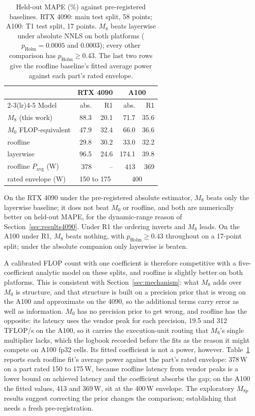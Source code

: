 \documentclass[conference]{IEEEtran}
\begin{document}
\begin{table}[t]
\caption{Held-out MAPE (\%) against pre-registered baselines. RTX 4090:
main test split, 58 points; A100: T1 test split, 17 points. $M_8$ beats
layerwise under absolute NNLS on both platforms ($p_{\mathrm{Holm}} =
0.0005$ and $0.0003$); every other comparison has $p_{\mathrm{Holm}} \geq
0.43$. The last two rows give the roofline baseline's fitted average power
against each part's rated envelope.}
\label{tab:baselines}
\centering
\small
\begin{tabular}{lrrrr}
\toprule
 & \multicolumn{2}{c}{RTX 4090} & \multicolumn{2}{c}{A100} \\
\cmidrule(lr){2-3}\cmidrule(lr){4-5}
Model & abs. & R1 & abs. & R1 \\
\midrule
$M_8$ (this work) & 88.3 & 20.1 & 71.7 & 35.6 \\
$M_0$ FLOP-equivalent & 47.9 & 32.4 & 66.0 & 36.6 \\
roofline & 29.8 & 30.2 & 33.0 & 32.2 \\
layerwise & 96.5 & 24.6 & 174.1 & 39.8 \\
\midrule
roofline $P_{\mathrm{avg}}$ (W) & 378 & -- & 413 & 369 \\
rated envelope (W) & \multicolumn{2}{c}{150 to 175} & \multicolumn{2}{c}{400} \\
\bottomrule
\end{tabular}
\end{table}

On the RTX 4090 under the pre-registered absolute estimator, $M_8$ beats
only the layerwise baseline; it does not beat $M_0$ or roofline, and both
are numerically better on held-out MAPE, for the dynamic-range reason of
Section~\ref{sec:results4090}. Under R1 the ordering inverts and $M_8$
leads. On the A100 under R1, $M_8$ beats nothing, with
$p_{\mathrm{Holm}} \geq 0.43$ throughout on a 17-point split; under the
absolute companion only layerwise is beaten.

A calibrated FLOP count with one coefficient is therefore competitive with
a five-coefficient analytic model on these splits, and roofline is slightly
better on both platforms. This is consistent with Section~\ref{sec:mechanism}:
what $M_8$ adds over $M_0$ is structure, and that structure is built on a
precision prior that is wrong on the A100 and approximate on the 4090, so
the additional terms carry error as well as information. $M_0$ has no
precision prior to get wrong, and roofline has the opposite: its latency
uses the vendor peak for each precision, 19.5 and 312\,TFLOP/s on the A100,
so it carries the execution-unit routing that $M_8$'s single multiplier
lacks, which the logbook recorded before the fits as the reason it might
compete on A100 fp32 cells. Its fitted coefficient is not a power, however.
Table~\ref{tab:baselines} reports each roofline fit's average power against
the part's rated envelope: 378\,W on a part rated 150 to 175\,W, because
roofline latency from vendor peaks is a lower bound on achieved latency and
the coefficient absorbs the gap; on the A100 the fitted values, 413 and
369\,W, sit at the 400\,W envelope. The exploratory $M_{8p}$ results suggest
correcting the prior changes the comparison; establishing that needs a
fresh pre-registration.
\end{document}
